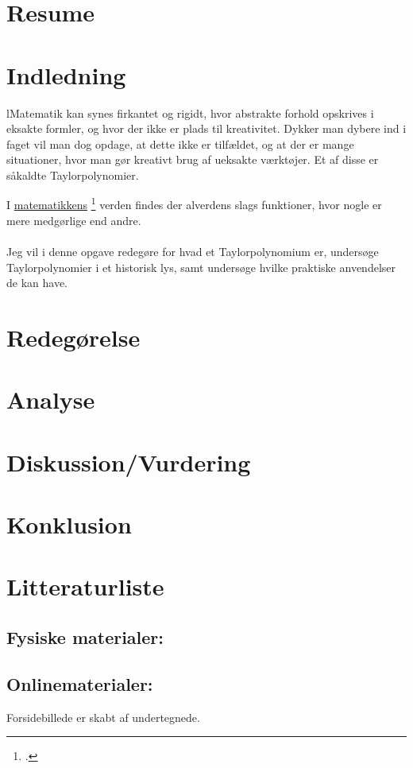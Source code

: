 \documentclass[12pt, a4paper]{article}
\begin{document}
\section*{Resume} %
\blindtext[1-2]
\tableofcontents
\newpage



\section{Indledning} %
lMatematik kan synes firkantet og rigidt, hvor abstrakte forhold opskrives i eksakte formler, og hvor der ikke er plads til kreativitet. Dykker man dybere ind i faget vil man dog opdage, at dette ikke er tilfældet, og at der er mange situationer, hvor man gør kreativt brug af ueksakte værktøjer. Et af disse er såkaldte Taylorpolynomier.


I \underline{matematikkens} \footcite{uvm} verden findes der alverdens slags funktioner, hvor nogle er mere medgørlige end andre.\\
\\
Jeg vil i denne opgave redegøre for hvad et Taylorpolynomium er, undersøge Taylorpolynomier i et historisk lys, samt undersøge hvilke praktiske anvendelser de kan have.

\section{Redegørelse} %

\section{Analyse} %

\section{Diskussion/Vurdering} %


\section{Konklusion} %

\section{Litteraturliste}
\nocite{*}
\subsection{Fysiske materialer:}
\printbibliography[keyword=bøger]
\subsection{Onlinematerialer:}
\printbibliography[keyword=online]
Forsidebillede er skabt af undertegnede.
\end{document}
